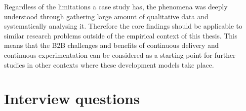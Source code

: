 \documentclass[english]{tktltiki2}
\theoremstyle{definition}
\theoremstyle{remark}
\begin{document}
\begin{enumerate}
Regardless of the limitations a case study has, the phenomena was deeply understood through gathering large amount of qualitative data and systematically analysing it. %
Therefore the core findings should be applicable to similar research problems outside of the empirical context of this thesis. This means that the B2B challenges and benefits of continuous delivery and continuous experimentation can be considered as a starting point for further studies in other contexts where these development models take place.


\newpage

%
%
% 
%






\newpage

\appendix
 
\section{Interview questions}


\end{enumerate}
\end{document}
